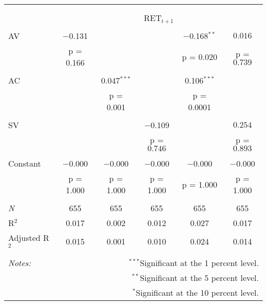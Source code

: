 
\begin{tabular}{@{\extracolsep{5pt}}lccccc} 
\\[-1.8ex]\hline 
\hline \\[-1.8ex] 
\\[-1.8ex] & \multicolumn{5}{c}{RET$_{t+1}$} \\ 
\hline \\[-1.8ex] 
 AV & $-$0.131 &  &  & $-$0.168$^{**}$ & $0.016$ \\ 
  & p = 0.166 &  &  & p = 0.020 & p = $0.739$ \\ 
  & & & & & \\ 
 AC &  & 0.047$^{***}$ &  & 0.106$^{***}$ &  \\ 
  &  & p = 0.001 &  & p = 0.0001 &  \\ 
  & & & & & \\ 
 SV &  &  & $-$0.109 &  & $0.254$ \\ 
  &  &  & p = $0.746$ &  & p = $0.893$ \\ 
  & & & & & \\ 
 Constant & $-$0.000 & $-$0.000 & $-$0.000 & $-$0.000 & $-$0.000 \\ 
  & p = 1.000 & p = 1.000 & p = 1.000 & p = 1.000 & p = 1.000 \\ 
  & & & & & \\ 
\textit{N} & 655 & 655 & 655 & 655 & 655 \\ 
R$^{2}$ & 0.017 & 0.002 & 0.012 & 0.027 & 0.017 \\ 
Adjusted R$^{2}$ & 0.015 & 0.001 & 0.010 & 0.024 & 0.014 \\ 
\hline 
\hline \\[-1.8ex] 
\textit{Notes:} & \multicolumn{5}{r}{$^{***}$Significant at the 1 percent level.} \\ 
 & \multicolumn{5}{r}{$^{**}$Significant at the 5 percent level.} \\ 
 & \multicolumn{5}{r}{$^{*}$Significant at the 10 percent level.} \\ 
\end{tabular} 

